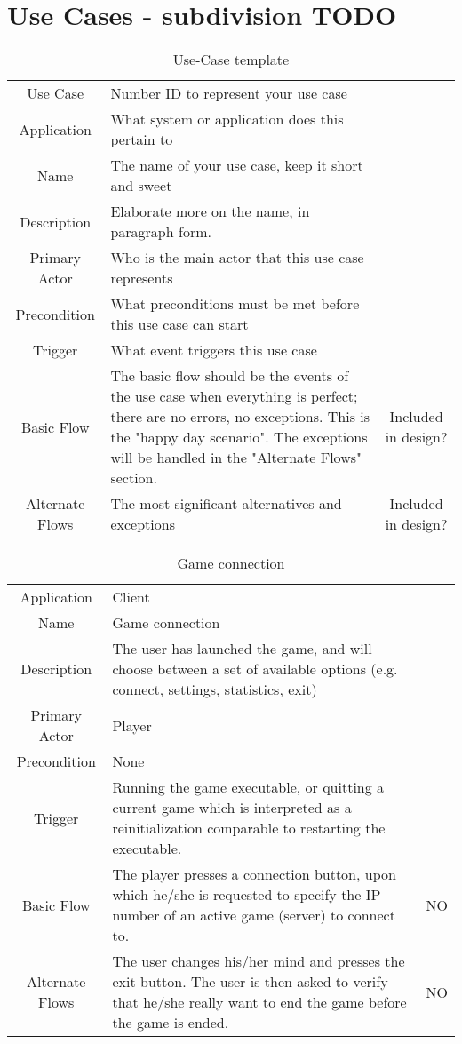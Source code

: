 
\section*{Use Cases - subdivision TODO}

\begin{table}[h!]
\label{template}
\caption{Use-Case template}
\begin{tabular}{|c| p{9cm}|c}
\hline
Use Case & Number ID to represent your use case & \\
Application & What system or application does this pertain to & \\
Name & The name of your use case, keep it short and sweet &  \\
Description	& Elaborate more on the name, in paragraph form. & \\
Primary Actor & Who is the main actor that this use case represents & \\
Precondition &	What preconditions must be met before this use case can start & \\
Trigger	& What event triggers this use case & \\ \hline
Basic Flow	& The basic flow should be the events of the use case when everything is perfect; there are no errors, no exceptions. This is the "happy day scenario". The exceptions will be handled in the "Alternate Flows" section. & Included in design? \\ \hline
Alternate Flows	& The most significant alternatives and exceptions & Included in design? \\
\hline
\end{tabular}
\end{table}

\begin{table}
\label{connection}
\caption{Game connection}
\begin{tabular}{|c| p{9cm}|c}
\hline
Application	& Client  & \\
Name & Game connection  & \\
Description	& The user has launched the game, and will choose between a set of available options (e.g. connect, settings, statistics, exit)  & \\
Primary Actor & Player & \\
Precondition &None & \\
Trigger & Running the game executable, or quitting a current game which is interpreted as a reinitialization comparable to restarting the executable.  & \\ \hline
Basic Flow & The player presses a connection button, upon which he/she is  requested to specify the IP-number of an active game (server) to connect to.  & NO \\ \hline
Alternate Flows & The user changes his/her mind and presses the exit button. The user is then asked to verify that he/she really want to end the game before the game is ended.  & NO \\
\hline
\end{tabular}
\end{table}


